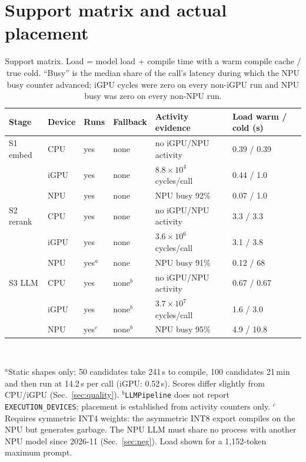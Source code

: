 \documentclass[10pt]{article}
\begin{document}
\section{Support matrix and actual placement}

\begin{table}[h]
\centering\small
\caption{Support matrix. Load = model load + compile time with a warm compile cache / true cold. ``Busy'' is
the median share of the call's latency during which the NPU busy counter advanced; iGPU cycles were zero on
every non-iGPU run and NPU busy was zero on every non-NPU run.}
\label{tab:support}
\begin{tabular}{llllll}
\toprule
Stage & Device & Runs & Fallback & Activity evidence & Load warm / cold (s) \\
\midrule
S1 embed  & CPU & yes & none & no iGPU/NPU activity & 0.39 / 0.39 \\
          & iGPU & yes & none & $8.8\times10^4$ cycles/call & 0.44 / 1.0 \\
          & NPU & yes & none & NPU busy 92\% & 0.07 / 1.0 \\
S2 rerank & CPU & yes & none & no iGPU/NPU activity & 3.3 / 3.3 \\
          & iGPU & yes & none & $3.6\times10^6$ cycles/call & 3.1 / 3.8 \\
          & NPU & yes$^{a}$ & none & NPU busy 91\% & 0.12 / 68 \\
S3 LLM    & CPU & yes & none$^{b}$ & no iGPU/NPU activity & 0.67 / 0.67 \\
          & iGPU & yes & none$^{b}$ & $3.7\times10^7$ cycles/call & 1.6 / 3.0 \\
          & NPU & yes$^{c}$ & none$^{b}$ & NPU busy 95\% & 4.9 / 10.8 \\
\bottomrule
\end{tabular}\\[2pt]
\raggedright\footnotesize
$^{a}$Static shapes only; 50 candidates take 241\,s to compile, 100 candidates 21\,min and then run at 14.2\,s per call
(iGPU: 0.52\,s). Scores differ slightly from CPU/iGPU (Sec.~\ref{sec:quality}).
$^{b}$\texttt{LLMPipeline} does not report \texttt{EXECUTION\_DEVICES}; placement is established from activity counters only.
$^{c}$Requires symmetric INT4 weights: the asymmetric INT8 export compiles on the NPU but generates garbage.
The NPU LLM must share no process with another NPU model since 2026-11 (Sec.~\ref{sec:neg}). Load shown for a
1{,}152-token maximum prompt.
\end{table}
\end{document}
